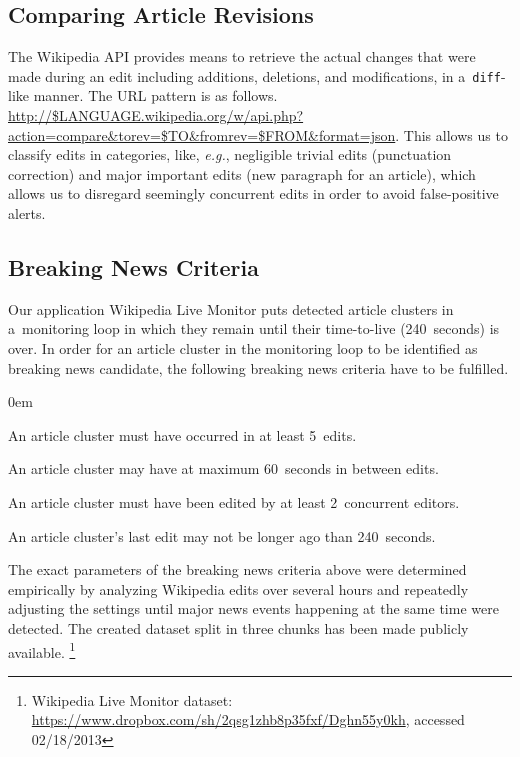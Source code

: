 \documentclass{sig-alternate}
\newcommand{\inlinelistingsize}{\fontsize{8pt}{11pt}}
\let\oldurl\url
\renewcommand{\url}[1]{\inlinelistingsize\oldurl{#1}}
\begin{document}
\subsection{Comparing Article Revisions}

The Wikipedia API provides means to retrieve the actual changes
that were made during an edit including additions, deletions,
and modifications, in a~\texttt{diff}-like manner.
The URL pattern is as follows.
\url{http://$LANGUAGE.wikipedia.org/w/api.php?action=compare&torev=$TO&fromrev=$FROM&format=json}. %
This allows us to classify edits in categories, like, \emph{e.g.},
negligible trivial edits (punctuation correction) and 
major important edits (new paragraph for an article),
which allows us to disregard seemingly concurrent edits
in order to avoid false-positive alerts.

\subsection{Breaking News Criteria}

Our application Wikipedia Live Monitor puts  
detected article clusters in a~monitoring loop in which they remain
until their time-to-live (240~seconds) is over.
In order for an article cluster in the monitoring loop
to be identified as breaking news candidate,
the following breaking news criteria have to be fulfilled.

\begin{description}
  \itemsep0em
  \item[$\geq$~5~Occurrences:] An article cluster must have occurred
  in at least 5~edits.
  \item[$\leq$~60~Seconds Between Edits:] An article cluster may have
  at maximum 60~seconds in between edits.
  \item[$\geq$~2~Concurrent Editors:] An article cluster must have been edited
  by at least 2~concurrent editors.
  \item[$\leq$~240~Seconds Since Last Edit:] An article cluster's last edit
  may not be longer ago than 240~seconds.
\end{description}

The exact parameters of the breaking news criteria above
were determined empirically by analyzing Wikipedia edits
over several hours and repeatedly adjusting the settings until
major news events happening at the same time were detected.
The created dataset split in three chunks has been made publicly available.%
\footnote{Wikipedia Live Monitor dataset: \url{https://www.dropbox.com/sh/2qsg1zhb8p35fxf/Dghn55y0kh},
accessed 02/18/2013}
\end{document}
